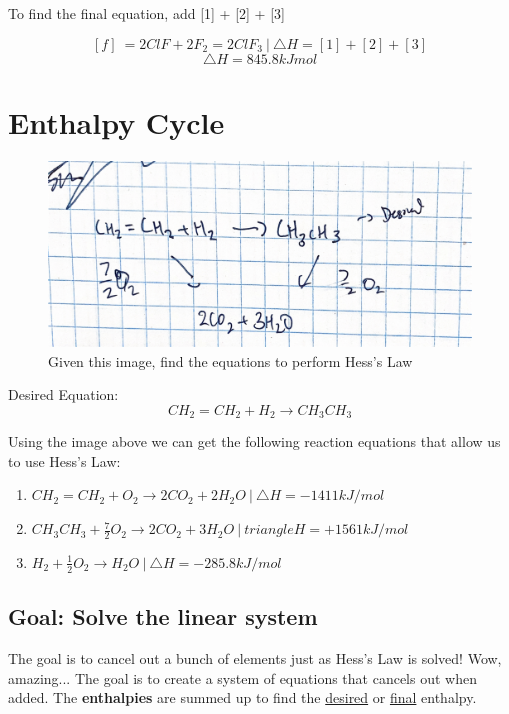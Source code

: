 \documentclass[12pt]{article} %
\begin{document}
To find the final equation, add [1] + [2] + [3]

$$[f]\ = 2ClF + 2F_2 = 2ClF_3\ |\ \triangle{H} = [1] + [2] + [3]$$
$$\triangle{H} = 845.8kJmol$$

\pagebreak

\section{Enthalpy Cycle}

\begin{figure}[h]
	\centering
	\includegraphics[width=\textwidth]{../images/1.2fig1.jpg}
	\caption{Given this image, find the equations to perform Hess's Law}
	\label{fig:image}
\end{figure}

Desired Equation:
$$CH_2=CH_2 + H_2 \rightarrow CH_3CH_3$$

Using the image above we can get the following reaction equations that allow us to use Hess's Law:

\begin{enumerate}
\item $CH_2=CH_2 + O_2 \rightarrow 2CO_2 + 2H_2O\ |\ \triangle{H} = -1411kJ/mol$
\item $CH_3CH_3 + \frac{7}{2}O_2 \rightarrow 2CO_2 + 3H_2O\ |\ triangle{H} = +1561kJ/mol$
\item $H_2 + \frac{1}{2}O_2 \rightarrow H_2O\ |\ \triangle{H} = -285.8kJ/mol$
\end{enumerate}

\subsection{\textbf{Goal: Solve the linear system}}

The goal is to cancel out a bunch of elements just as Hess's Law is solved! Wow, amazing...
The goal is to create a system of equations that cancels out when added. The \textbf{enthalpies} are summed up to find the \underline{desired} or \underline{final} enthalpy.\\
\end{document}
